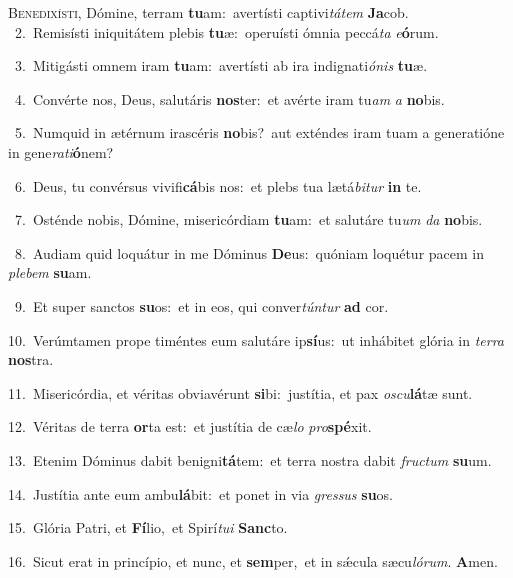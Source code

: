 \lettrine{\initial\textcolor{\initialcolor}{B}}{enedixísti,} Dómine, terram \textbf{tu}\-am:~\star avertísti captivi\-\textit{tá}\-\textit{tem} \textbf{Ja}\-cob.\\
{\numbfont\textcolor{\numbcolor}{~2.}}~Remisísti iniquitátem plebis \textbf{tu}\-æ:~\star operuísti ómnia peccá\textit{ta} \textit{e}\-\textbf{ó}rum.\par
{\numbfont\textcolor{\numbcolor}{~3.}}~Mitigásti omnem iram \textbf{tu}\-am:~\star avertísti ab ira indignati\-\textit{ó}\-\textit{nis} \textbf{tu}\-æ.\par
{\numbfont\textcolor{\numbcolor}{~4.}}~Convérte nos, Deus, salutáris \textbf{nos}\-ter:~\star et avérte iram tu\textit{am} \textit{a} \textbf{no}\-bis.\par
{\numbfont\textcolor{\numbcolor}{~5.}}~Numquid in ætérnum irascéris \textbf{no}\-bis?~\star aut exténdes iram tuam a generatióne in gene\-\textit{ra}\-\textit{ti}\textbf{ó}nem?\par
{\numbfont\textcolor{\numbcolor}{~6.}}~Deus, tu convérsus vivifi\-\textbf{cá}\-bis nos:~\star et plebs tua lætá\-\textit{bi}\-\textit{tur} \textbf{in} te.\par
{\numbfont\textcolor{\numbcolor}{~7.}}~Osténde nobis, Dómine, misericórdiam \textbf{tu}\-am:~\star et salutáre tu\textit{um} \textit{da} \textbf{no}\-bis.\par
{\numbfont\textcolor{\numbcolor}{~8.}}~Audiam quid loquátur in me Dóminus \textbf{De}\-us:~\star quóniam loquétur pacem in \textit{ple}\-\textit{bem} \textbf{su}\-am.\par
{\numbfont\textcolor{\numbcolor}{~9.}}~Et super sanctos \textbf{su}\-os:~\star et in eos, qui conver\-\textit{tún}\-\textit{tur} \textbf{ad} cor.\par
{\numbfont\textcolor{\numbcolor}{10.}}~Verúmtamen prope timéntes eum salutáre ip\-\textbf{sí}\-us:~\star ut inhábitet glória in \textit{ter}\-\textit{ra} \textbf{nos}\-tra.\par
{\numbfont\textcolor{\numbcolor}{11.}}~Misericórdia, et véritas obviavérunt \textbf{si}\-bi:~\star justítia, et pax \textit{os}\-\textit{cu}\textbf{lá}tæ sunt.\par
{\numbfont\textcolor{\numbcolor}{12.}}~Véritas de terra \textbf{or}\-ta est:~\star et justítia de cæ\textit{lo} \textit{pro}\-\textbf{spé}xit.\par
{\numbfont\textcolor{\numbcolor}{13.}}~Etenim Dóminus dabit benigni\-\textbf{tá}\-tem:~\star et terra nostra dabit \textit{fruc}\-\textit{tum} \textbf{su}\-um.\par
{\numbfont\textcolor{\numbcolor}{14.}}~Justítia ante eum ambu\-\textbf{lá}\-bit:~\star et ponet in via \textit{gres}\-\textit{sus} \textbf{su}\-os.\par
{\numbfont\textcolor{\numbcolor}{15.}}~Glória Patri, et \textbf{Fí}\-lio,~\star et Spirí\-\textit{tu}\-\textit{i} \textbf{Sanc}\-to.\par
{\numbfont\textcolor{\numbcolor}{16.}}~Sicut erat in princípio, et nunc, et \textbf{sem}\-per,~\star et in sǽcula sæcu\-\textit{ló}\-\textit{rum}. \textbf{A}\-men.\par
